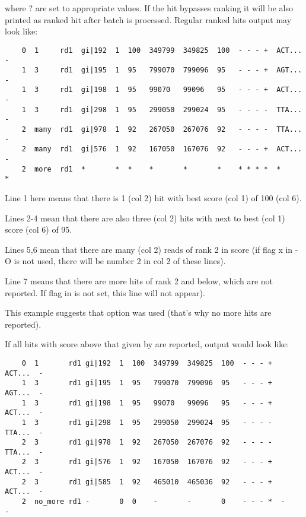 \documentclass[english,letter]{article}
\begin{document}
    where ? are set to appropriate values. If the hit bypasses ranking it will
    be also printed as ranked hit after batch is processed. Regular ranked
    hits output may look like:

	\begin{verbatim}
    0  1     rd1  gi|192  1  100  349799  349825  100  - - - +  ACT...  -
    1  3     rd1  gi|195  1  95   799070  799096  95   - - - +  AGT...  -
    1  3     rd1  gi|198  1  95   99070   99096   95   - - - +  ACT...  -
    1  3     rd1  gi|298  1  95   299050  299024  95   - - - -  TTA...  -
    2  many  rd1  gi|978  1  92   267050  267076  92   - - - -  TTA...  -
    2  many  rd1  gi|576  1  92   167050  167076  92   - - - +  ACT...  -
    2  more  rd1  *       *  *    *       *       *    * * * *  *       *
	\end{verbatim}

    Line 1 here means that there is 1 (col 2) hit with best score (col 1) of 
    100 (col 6).

    Lines 2-4 mean that there are also three (col 2) hits with next to best 
    (col 1) score (col 6) of 95.

    Lines 5,6 mean that there are many (col 2) reads of rank 2 in score (if 
    flag x in -O is not used, there will be number 2 in col 2 of these lines).

    Line 7 means that there are more hits of rank 2 and below, which are not
    reported. If flag  in  is not set, this line will not appear).

    This example suggests that  option was used (that's why no more hits
    are reported).

    If all hits with score above that given by  are reported, output would
    look like:

	\begin{verbatim}
    0  1       rd1 gi|192  1  100  349799  349825  100  - - - +  ACT...  -
    1  3       rd1 gi|195  1  95   799070  799096  95   - - - +  AGT...  -
    1  3       rd1 gi|198  1  95   99070   99096   95   - - - +  ACT...  -
    1  3       rd1 gi|298  1  95   299050  299024  95   - - - -  TTA...  -
    2  3       rd1 gi|978  1  92   267050  267076  92   - - - -  TTA...  -
    2  3       rd1 gi|576  1  92   167050  167076  92   - - - +  ACT...  -
    2  3       rd1 gi|585  1  92   465010  465036  92   - - - +  ACT...  -
    2  no_more rd1 -       0  0    -       -       0    - - - *  -       -
	\end{verbatim}
\end{document}
